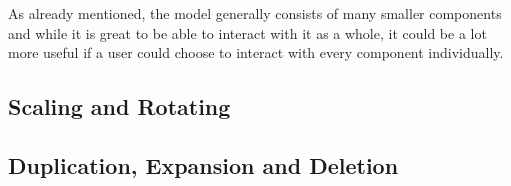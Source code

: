 As already mentioned, the model generally consists of many smaller components and while it is great to be able to interact with it as a whole, it could be a lot more useful if a user could choose to interact with every component individually.

\subsection{Scaling and Rotating}

\subsection{Duplication, Expansion and Deletion}



